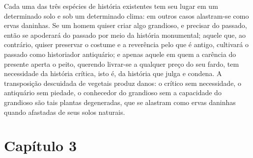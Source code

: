 Cada uma das três espécies de história existentes tem seu lugar em um
determinado solo e sob um determinado clima: em outros casos alastram-se
como ervas daninhas. Se um homem quiser criar algo grandioso, e 
precisar do passado, então se apoderará do passado por meio da
história monumental; aquele que, ao contrário, quiser preservar o
costume e a reverência pelo que é antigo, cultivará o passado como
historiador antiquário; e apenas aquele em quem a carência do presente
aperta o peito, querendo livrar-se a qualquer preço do seu fardo, tem
necessidade da história crítica, isto é, da história que julga e
condena. A transposição descuidada de vegetais produz danos: o crítico
sem necessidade, o antiquário sem piedade, o conhecedor do grandioso sem
a capacidade do grandioso são tais plantas degeneradas, que se alastram
como ervas daninhas quando afastadas de seus solos naturais.

\chapter{Capítulo 3}\label{capuxedtulo-3}

